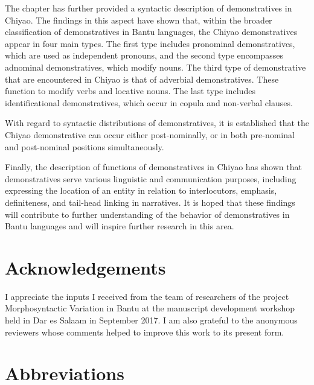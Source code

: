 \documentclass[output=paper,
            colorlinks, citecolor=brown
            ,draftmode
		  ]{langscibook}
\begin{document}
The chapter has further provided a syntactic description of demonstratives in Chiyao. The findings in this aspect have shown that, within the broader classification of demonstratives in Bantu languages, the Chiyao demonstratives appear in four main types. The first type includes pronominal demonstratives, which are used as independent pronouns, and the second type encompasses adnominal demonstratives, which modify nouns. The third type of demonstrative that are encountered in Chiyao is that of adverbial demonstratives. These function to modify verbs and locative nouns. The last type includes identificational demonstratives, which occur in copula and non-verbal clauses.



With regard to syntactic distributions of demonstratives, it is established that the Chiyao demonstrative can occur either post-nominally, or in both pre-nom\-i\-nal and post-nom\-i\-nal positions simultaneously. 


Finally, the description of functions of demonstratives in Chiyao has shown that demonstratives serve various linguistic and communication purposes, including expressing the location of an entity in relation to interlocutors, emphasis, definiteness, and tail-head linking in narratives. It is hoped that these findings will contribute to further understanding of the behavior of demonstratives in Bantu languages and will inspire further research in this area.
\section*{Acknowledgements}
I appreciate the inputs I received from the team of researchers of the project Morphosyntactic Variation in Bantu at the manuscript development workshop held in Dar es Salaam in September 2017. I am also grateful to the anonymous reviewers whose comments helped to improve this work to its present form.


\section*{Abbreviations}
\end{document}
